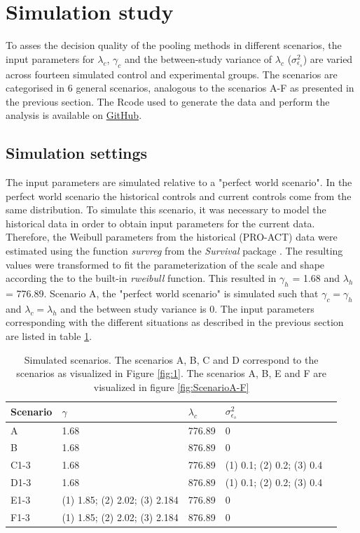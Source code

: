 \documentclass[Royal,sagev,times]{sagej}
\begin{document}
\section{Simulation study}
To asses the decision quality of the pooling methods in different scenarios, the input parameters for $\lambda_{c}$, $\gamma_{c}$ and the between-study variance of $\lambda_{c}$ ($\sigma^2_{\epsilon_{s}}$) are varied across fourteen simulated control and experimental groups. The scenarios are categorised in 6 general scenarios, analogous to the scenarios A-F as presented in the previous section. The Rcode used to generate the data and perform the analysis is available on \href{https://github.com/JoukjeWillemsen/Research-Repository-Master-Thesis}{GitHub}. 

\subsection{Simulation settings}
The input parameters are simulated relative to a "perfect world scenario". In the perfect world scenario the historical controls and current controls come from the same distribution. To simulate this scenario, it was necessary to model the historical data in order to obtain input parameters for the current data. Therefore, the Weibull parameters from the historical (PRO-ACT) data were estimated using the function \textit{survreg} from the \textit{Survival} package \cite{survivalpackage}. The resulting values were transformed to fit the parameterization of the scale and shape according the to the built-in \textit{rweibull} function. This resulted in $\gamma_{h}$ = 1.68 and $\lambda_{h}$ = 776.89. Scenario A, the "perfect world scenario" is simulated such that $\gamma_{c} = \gamma_{h}$ and $\lambda_{c} = \lambda_{h}$ and the between study variance is $0$. The input parameters corresponding with the different situations as described in the previous section are listed in table \ref{T1}. 

\begin{table}[h!]
\caption{Simulated scenarios. The scenarios A, B, C and D correspond to the scenarios as visualized in Figure \ref{fig:1}. The scenarios A, B, E and F are visualized in figure \ref{fig:ScenarioA-F}\label{T1}}
\begin{tabular}{lllll}
\toprule
Scenario&$\gamma$&$\lambda_{c}$&$\sigma^2_{\epsilon_{s}}$\\
\midrule
A&1.68&776.89&0 \\ 
B&1.68&876.89&0 \\ 
C1-3&1.68&776.89&(1) 0.1; (2) 0.2; (3) 0.4\\ 
D1-3&1.68&876.89&(1) 0.1; (2) 0.2; (3) 0.4\\ 
E1-3&(1) 1.85; (2) 2.02; (3) 2.184 & 776.89 & 0\\ 
F1-3&(1) 1.85; (2) 2.02; (3) 2.184  & 876.89 & 0\\ 
\bottomrule
\end{tabular}\\[10pt]
\end{table}
\end{document}
